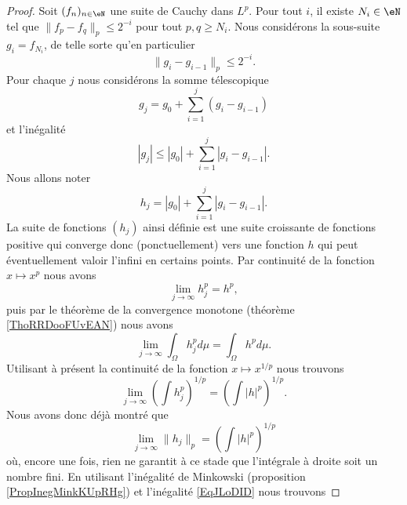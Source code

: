 \begin{proof}
    Soit \( (f_n)_{n\in\eN}\) une suite de Cauchy dans \( L^p\). Pour tout \( i\), il existe \( N_i\in\eN\) tel que $\| f_p-f_q \|_p\leq 2^{-i}$ pour tout \( p,q\geq N_i\). Nous considérons la sous-suite \( g_i=f_{N_i}\), de telle sorte qu'en particulier
    \begin{equation}    \label{EqJLoDID}
        \|g_i-g_{i-1}\|_p\leq 2^{-i}.
    \end{equation}
    Pour chaque \( j\) nous considérons la somme télescopique
    \begin{equation}
        g_j=g_0+\sum_{i=1}^j(g_i-g_{i-1})
    \end{equation}
    et l'inégalité
    \begin{equation}
        | g_j |\leq | g_0 |+\sum_{i=1}^j| g_i-g_{i-1} |.
    \end{equation}
    Nous allons noter
    \begin{equation}        \label{EqSomPaFPQOWC}
        h_j=| g_0 |+\sum_{i=1}^j| g_i-g_{i-1} |.
    \end{equation}
    La suite de fonctions \( (h_j)\) ainsi définie est une suite croissante de fonctions positive qui converge donc (ponctuellement) vers une fonction \( h\) qui peut éventuellement valoir l'infini en certains points. Par continuité de la fonction \( x\mapsto x^p\) nous avons
    \begin{equation}
        \lim_{j\to \infty} h_j^p=h^p,
    \end{equation}
    puis par le théorème de la convergence monotone (théorème \ref{ThoRRDooFUvEAN}) nous avons
    \begin{equation}
        \lim_{j\to \infty} \int_{\Omega}h_j^pd\mu=\int_{\Omega}h^pd\mu.
    \end{equation}
    Utilisant à présent la continuité de la fonction \( x\mapsto x^{1/p}\) nous trouvons
    \begin{equation}
        \lim_{j\to \infty} \left( \int h_j^p \right)^{1/p}=\left( \int | h |^p \right)^{1/p}.
    \end{equation}
    Nous avons donc déjà montré que
    \begin{equation}
        \lim_{j\to \infty} \| h_j \|_p=\left( \int | h |^p \right)^{1/p}
    \end{equation}
    où, encore une fois, rien ne garantit à ce stade que l'intégrale à droite soit un nombre fini. En utilisant l'inégalité de Minkowski (proposition \ref{PropInegMinkKUpRHg}) et l'inégalité \eqref{EqJLoDID} nous trouvons

\end{proof}
